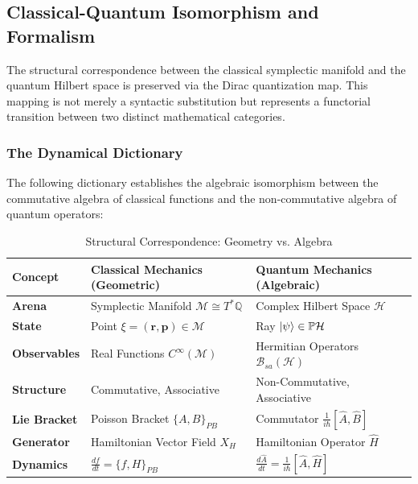 \subsection{Classical-Quantum Isomorphism and Formalism}

The structural correspondence between the classical symplectic manifold and the
quantum Hilbert space is preserved via the Dirac quantization map. This mapping
is not merely a syntactic substitution but represents a functorial transition
between two distinct mathematical categories.

\subsubsection{The Dynamical Dictionary}
The following dictionary establishes the algebraic isomorphism between the
commutative algebra of classical functions and the non-commutative algebra of
quantum operators:

\begin{table}[h]
	\centering
	\caption{Structural Correspondence: Geometry vs. Algebra}
	\label{tab:correspondence}
	\begin{tabular}{@{}lll@{}}
		\toprule
		\textbf{Concept} & \textbf{Classical Mechanics (Geometric)} &
		\textbf{Quantum Mechanics (Algebraic)} \\ \midrule
		\textbf{Arena} & Symplectic Manifold $\mathcal{M} \cong T^*\mathbb{Q}$ &
		Complex Hilbert Space $\mathcal{H}$ \\
		\textbf{State} & Point $\xi = (\mathbf{r}, \mathbf{p}) \in \mathcal{M}$
									& Ray $\ket{\psi} \in \mathbb{P}\mathcal{H}$ \\
		\textbf{Observables} & Real Functions $C^\infty(\mathcal{M})$ &
		Hermitian Operators $\mathcal{B}_{sa}(\mathcal{H})$ \\
		\textbf{Structure} & Commutative, Associative & Non-Commutative,
		Associative \\
		\textbf{Lie Bracket} & Poisson Bracket $\{A, B\}_{PB}$ & Commutator
		$\frac{1}{i\hbar}[\hat{A}, \hat{B}]$ \\
		\textbf{Generator} & Hamiltonian Vector Field $X_H$ & Hamiltonian
		Operator $\hat{H}$ \\
		\textbf{Dynamics} & $\frac{df}{dt} = \{f, H\}_{PB}$ &
		$\frac{d\hat{A}}{dt} = \frac{1}{i\hbar}[\hat{A}, \hat{H}]$ \\
		\bottomrule
	\end{tabular}
\end{table}

